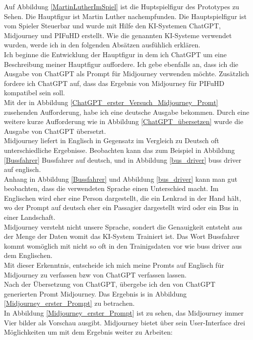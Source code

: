 Auf Abbildung \ref{MartinLutherImSpiel} ist die Huptspielfigur des Prototypes zu Sehen. Die Hauptfigur ist Martin Luther nachempfunden. Die Hauptspielfigur ist vom Spieler Steuerbar und wurde mit Hilfe den KI-Systemen ChatGPT, Midjourney und PIFuHD erstellt. Wie die genannten KI-Systeme verwendet wurden, werde ich in den folgenden Absätzen ausfühlich erklären.
\\
Ich beginne die Entwicklung der Hauptfigur in dem ich ChatGPT um eine Beschreibung meiner Hauptfigur auffordere. Ich gebe ebenfalls an, dass ich die Ausgabe von ChatGPT als Prompt für Midjourney verwenden möchte. Zusätzlich fordere ich ChatGPT auf, dass das Ergebnis von Midjourney für PIFuHD kompatibel sein soll.
\\
Mit der in Abbildung \ref{ChatGPT_erster_Versuch_Midjourney_Promt} zusehenden Aufforderung, habe ich eine deutsche Ausgabe bekommen. Durch eine weitere kurze Aufforderung wie in Abbildung \ref{ChatGPT_übersetzen} wurde die Ausgabe von ChatGPT übersetzt.
\\
Midjourney liefert in Englisch in Gegensatz im Vergleich zu Deutsch oft unterschiedliche Ergebnisse. Beobachten kann das zum Beispiel in Abbildung \ref{Bussfahrer} Bussfahrer auf deutsch, und in Abbildung \ref{bus_driver} buss driver auf englisch.
\\
Anhang in Abbildung \ref{Bussfahrer} und Abbildung \ref{bus_driver} kann man gut beobachten, dass die verwendeten Sprache einen Unterschied macht. Im Englischen wird eher eine Person dargestellt, die ein Lenkrad in der Hand hält, wo der Prompt auf deutsch eher ein Passagier dargestellt wird oder ein Bus in einer Landschaft.
\\
Midjourney versteht nicht unsere Sprache, sondert die Genauigkeit entsteht aus der Menge der Daten womit das KI-System Trainiert ist. Das Wort Bussfahrer kommt womöglich mit nicht so oft in den Trainigsdaten vor wie buss driver aus dem Englischen.
\\
Mit dieser Erkenntnis, entscheide ich mich meine Promts auf Englisch für Midjourney zu verfassen bzw von ChatGPT verfassen lassen.
\\
Nach der Übersetzung von ChatGPT, übergebe ich den von ChatGPT generierten Promt Midjourney. Das Ergebnis is in Abbildung \ref{Midjourney_erster_Prompt} zu betrachen.
\\
In Abbildung \ref{Midjourney_erster_Prompt} ist zu sehen, das Midjourney immer Vier bilder als Vorschau ausgibt. Midjourney bietet über sein User-Interface drei Möglichkeiten um mit dem Ergebnis weiter zu Arbeiten:
